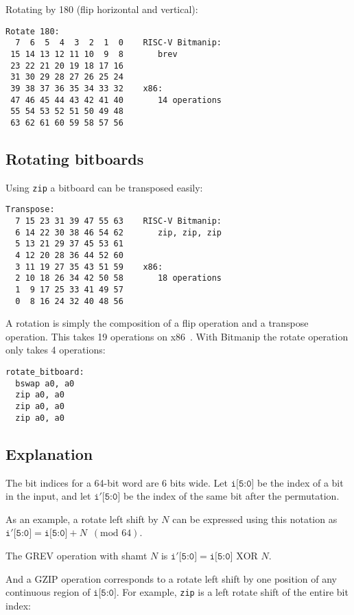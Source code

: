 Rotating by 180 (flip horizontal and vertical):

\begin{verbatim}
Rotate 180:
  7  6  5  4  3  2  1  0    RISC-V Bitmanip:
 15 14 13 12 11 10  9  8       brev
 23 22 21 20 19 18 17 16
 31 30 29 28 27 26 25 24
 39 38 37 36 35 34 33 32    x86:
 47 46 45 44 43 42 41 40       14 operations
 55 54 53 52 51 50 49 48
 63 62 61 60 59 58 57 56
\end{verbatim}

\subsection{Rotating bitboards}

Using {\tt zip} a bitboard can be transposed easily:
\label{transposebitboard}

\begin{verbatim}
Transpose:
  7 15 23 31 39 47 55 63    RISC-V Bitmanip:
  6 14 22 30 38 46 54 62       zip, zip, zip
  5 13 21 29 37 45 53 61
  4 12 20 28 36 44 52 60
  3 11 19 27 35 43 51 59    x86:
  2 10 18 26 34 42 50 58       18 operations
  1  9 17 25 33 41 49 57
  0  8 16 24 32 40 48 56
\end{verbatim}

A rotation is simply the composition of a flip operation and a transpose
operation. This takes 19 operations on x86~\cite{ChessProg}. With Bitmanip
the rotate operation only takes 4 operations:

\begin{verbatim}
rotate_bitboard:
  bswap a0, a0
  zip a0, a0
  zip a0, a0
  zip a0, a0
\end{verbatim}

\subsection{Explanation}

The bit indices for a 64-bit word are 6 bits wide. Let $\texttt{i[5:0]}$ be the
index of a bit in the input, and let $\texttt{i$'$[5:0]}$ be the index of the
same bit after the permutation.

As an example, a rotate left shift by $N$ can be expressed using this notation
as $\texttt{i$'$[5:0]} = \texttt{i[5:0]} + N \,\,\, (\textrm{mod 64})$.

The GREV operation with shamt $N$ is $\texttt{i$'$[5:0]} = \texttt{i[5:0]} \textrm{ XOR } N$.

And a GZIP operation corresponds to a rotate left shift by one position of any
continuous region of $\texttt{i[5:0]}$. For example, {\tt zip} is a left rotate shift
of the entire bit index:

